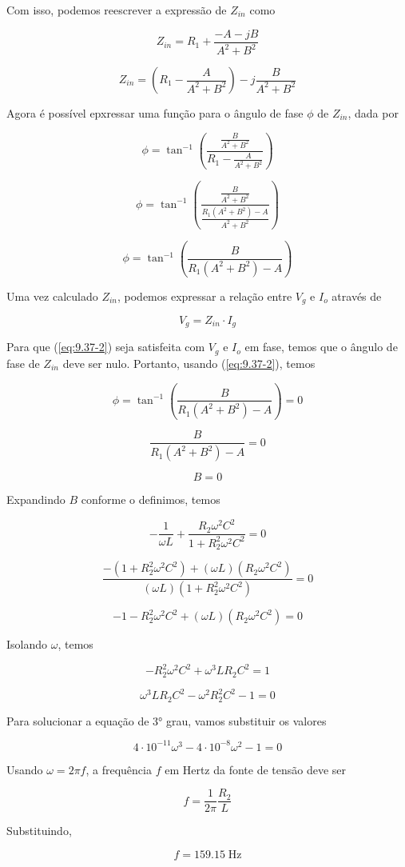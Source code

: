 Com isso, podemos reescrever a expressão de \( Z_{in} \) como

\[ Z_{in} = R_1 + \frac{- A - jB}{A^2 + B^2}  \]

\[ Z_{in} = \left(R_1 - \frac{A}{A^2 + B^2}\right) - j\frac{B}{A^2 + B^2}  \]

Agora é possível epxressar uma função para o ângulo de fase \( \phi \) de \( Z_{in} \), dada por

\[ \phi = \tan^{-1}\left(\frac{\frac{B}{A^2 + B^2}}{R_1 - \frac{A}{A^2 + B^2}}\right) \]

\[ \phi = \tan^{-1}\left(\frac{\frac{B}{A^2 + B^2}}{\frac{R_1(A^2 + B^2) - A}{A^2 + B^2}}\right) \]

\begin{equation}\label{eq:9.37-1}\tag{9.37-1}
    \phi = \tan^{-1}\left(\frac{B}{R_1(A^2 + B^2) - A}\right)
\end{equation}

Uma vez calculado $Z_{in}$, podemos expressar a relação entre $V_g$ e $I_o$ através de

\begin{equation}\label{eq:9.37-2}\tag{9.37-2}
    V_g = Z_{in} \cdot I_g
\end{equation}

Para que (\ref{eq:9.37-2}) seja satisfeita com $V_g$ e $I_o$ em fase, temos que o ângulo de fase de $Z_{in}$ deve ser nulo. Portanto, usando (\ref{eq:9.37-2}), temos

\[ \phi = \tan^{-1}\left(\frac{B}{R_1(A^2 + B^2) - A}\right) = 0 \]

\[ \frac{B}{R_1(A^2 + B^2) - A} = 0 \]

\[ B = 0 \]

Expandindo $B$ conforme o definimos, temos

\[ -\frac{1}{\omega L} + \frac{R_2\omega^2 C^2}{1 + R_2^2\omega^2 C^2} = 0 \]

\[ \frac{-(1 + R_2^2\omega^2 C^2) + (\omega L)(R_2\omega^2 C^2)}{(\omega L)(1 + R_2^2\omega^2 C^2)} = 0 \]

\[ -1 - R_2^2\omega^2 C^2 + (\omega L)(R_2\omega^2 C^2) = 0 \]

Isolando $\omega$, temos

\[ - R_2^2\omega^2 C^2 + \omega^3LR_2C^2 = 1 \]

\[ \omega^3LR_2C^2 - \omega^2R_2^2C^2 - 1 = 0\]

Para solucionar a equação de 3° grau, vamos substituir os valores

\[ 4\cdot10^{-11}\omega^3 - 4\cdot10^{-8}\omega^2 - 1 = 0\]


Usando $\omega = 2\pi f$, a frequência $f$ em Hertz da fonte de tensão deve ser

\begin{equation}\label{eq:9.37-3}\tag{9.37-3}
    f = \frac{1}{2\pi}\frac{R_2}{L}
\end{equation}

Substituindo,

\[ \boxed{f = 159.15 \; \textrm{Hz}}  \]









